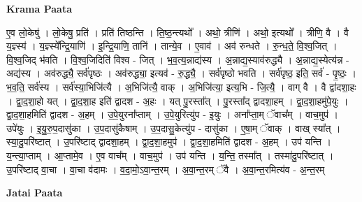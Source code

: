 \documentclass[17pt]{extarticle}
\begin{document}
\textbf{Krama Paata} \newline

ए॒व लो॒केषु॑ । लो॒केषु॒ प्रति॑ । प्रति॑ तिष्ठन्ति । ति॒ष्ठ॒न्त्यथो᳚ । अथो॒ त्रीणि॑ । अथो॒ इत्यथो᳚ । त्रीणि॒ वै । वै य॒ज्ञ्स्य॑ । य॒ज्ञ्स्ये᳚न्द्रि॒याणि॑ । इ॒न्द्रि॒याणि॒ तानि॑ । तान्ये॒व । ए॒वाव॑ । अव॑ रुन्धते । रु॒न्ध॒ते॒ वि॒श्व॒जित् । वि॒श्व॒जिद् भ॑वति । वि॒श्व॒जिदिति॑ विश्व - जित् । भ॒व॒त्य॒न्नाद्य॑स्य । अ॒न्नाद्य॒स्याव॑रुद्ध्यै । अ॒न्नाद्य॒स्येत्य॑न्न - अद्य॑स्य । अव॑रुद्ध्यै॒ सर्व॑पृष्ठः । अव॑रुद्ध्या॒ इत्यव॑ - रु॒द्ध्यै॒ । सर्व॑पृष्ठो भवति । सर्व॑पृष्ठ॒ इति॒ सर्व॑ - पृ॒ष्ठः॒ । भ॒व॒ति॒ सर्व॑स्य । सर्व॑स्या॒भिजि॑त्यै । अ॒भिजि॑त्यै॒ वाक् । अ॒भिजि॑त्या॒ इत्य॒भि - जि॒त्यै॒ । वाग् वै । वै द्वा॑दशा॒हः । द्वा॒द॒शा॒हो यत् । द्वा॒द॒शा॒ह इति॑ द्वादश - अ॒हः । यत् पु॒रस्ता᳚त् । पु॒रस्ता᳚द् द्वादशा॒हम् । द्वा॒द॒शा॒हमु॑पे॒युः । द्वा॒द॒शा॒हमिति॑ द्वादश - अ॒हम् । उ॒पे॒युरना᳚प्ताम् । उ॒पे॒युरित्यु॑प - इ॒युः । अना᳚प्ता॒म् ॅवाच᳚म् । वाच॒मुप॑ । उपे॑युः । इ॒यु॒रु॒प॒दासु॑का । उ॒प॒दासु॑कैषाम् । उ॒प॒दासु॒केत्यु॑प - दासु॑का । ए॒षा॒म् ॅवाक् । वाख् स्या᳚त् । स्या॒दु॒परि॑ष्टात् । उ॒परि॑ष्टाद् द्वादशा॒हम् । द्वा॒द॒शा॒हमुप॑ । द्वा॒द॒शा॒हमिति॑ द्वादश - अ॒हम् । उप॑ यन्ति । य॒न्त्या॒प्ताम् । आ॒प्तामे॒व । ए॒व वाच᳚म् । वाच॒मुप॑ । उप॑ यन्ति । य॒न्ति॒ तस्मा᳚त् । तस्मा॑दु॒परि॑ष्टात् । उ॒परि॑ष्टाद् वा॒चा । वा॒चा व॑दामः । व॒दा॒मो॒ऽवा॒न्त॒रम् । अ॒वा॒न्त॒रम् ॅवै । अ॒वा॒न्त॒रमित्य॑व - अ॒न्त॒रम् \newline

\textbf{Jatai Paata} \newline
\end{document}
